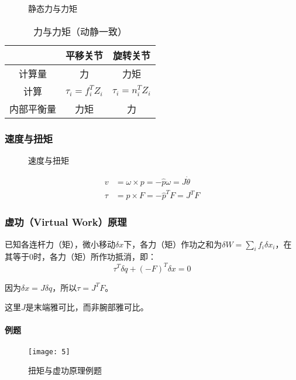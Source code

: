 \documentclass[
12pt, %
a4paper, 
oneside, %
headinclude,footinclude, %
]{scrartcl}
\begin{document}
\begin{figure}[H]
\centering
{} \quad
{} \quad
{}
\caption[静态力与力矩]{静态力与力矩}
\end{figure}

\begin{table}[H]
\centering
\begin{tabular}{c|cc}
\hline
& 平移关节 & 旋转关节 \\
\hline
计算量 & 力 & 力矩 \\
计算 & $ \tau_i = f_i^T Z_i $ & $ \tau_i = n_i^T Z_i $ \\
内部平衡量 & 力矩 & 力 \\
\hline
\end{tabular}
\caption{力与力矩（动静一致）}
\end{table}
\subsubsection[速度与扭矩]{速度与扭矩}
\begin{figure}[H]
\centering
\subfloat[角速度与线速度]{\texttt{[image: wv]}} \quad
\subfloat[力与扭矩]{\texttt{[image: ft]}}
\caption[速度与扭矩]{速度与扭矩}
\end{figure}

\begin{align*}
v &= \omega \times p = -\hat{p} \omega = J \dot{\theta} \\
\tau &= p \times F = -\hat{p}^T F = J^T F
\end{align*}
\subsubsection[虚功原理]{虚功（Virtual Work）原理}
已知各连杆力（矩），微小移动$ \delta x $下，各力（矩）作功之和为$ \delta W = \sum_i f_i \delta x_i $，在其等于$ 0 $时，各力（矩）所作功抵消，即：
$$ \tau^T \delta q + (-F)^T \delta x = 0 $$

因为$ \delta x = J \delta q $，所以$ \tau = J^T F $。

这里$ J $是末端雅可比，而非腕部雅可比。
\paragraph{例题}
\begin{figure}[H]
\centering 
\texttt{[image: 5]} 
\caption[扭矩与虚功原理例题]{扭矩与虚功原理例题}
\end{figure}
\end{document}
